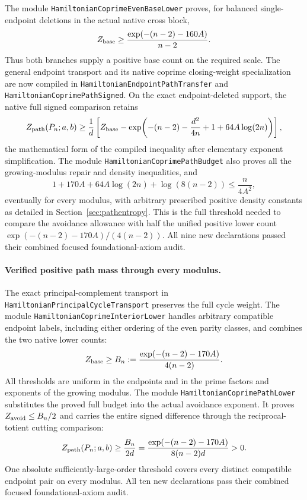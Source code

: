 The module \texttt{HamiltonianCoprimeEvenBaseLower} proves, for
balanced single-endpoint deletions in the actual native cross block,
\[
 Z_{\rm base}\geq
       \frac{\exp(-(n-2)-160A)}{n-2}.
\]
Thus both branches supply a positive base count on the required scale.
The general endpoint transport and its native coprime closing-weight
specialization are now compiled in \texttt{HamiltonianEndpointPathTransfer}
and \texttt{HamiltonianCoprimePathSigned}.
On the exact endpoint-deleted support, the native full signed
comparison retains
\[
 Z_{\rm path}(P_n;a,b)\geq\frac1d
 \left[Z_{\rm base}-
       \exp\!\left(-(n-2)-\frac{d^2}{4n}+1
                         +64A\log(2n)\right)\right],
\]
the mathematical form of the compiled inequality after elementary
exponent simplification.
The module \texttt{HamiltonianCoprimePathBudget} also proves all the
growing-modulus repair and density inequalities, and
\[
 1+170A+64A\log(2n)+\log(8(n-2))\leq\frac n{4A^2},
\]
eventually for every modulus, with arbitrary prescribed positive
density constants as detailed in Section~\ref{sec:pathentropy}.
This is the full threshold needed to compare the avoidance allowance
with half the unified positive lower count
\(\exp(-(n-2)-170A)/(4(n-2))\).
All nine new declarations passed their combined focused
foundational-axiom audit.
\paragraph{Verified positive path mass through every modulus.}
The exact principal-complement transport in
\texttt{HamiltonianPrincipalCycleTransport} preserves the full cycle
weight. The module \texttt{HamiltonianCoprimeInteriorLower} handles
arbitrary compatible endpoint labels, including either ordering of
the even parity classes, and combines the two native lower counts:
\[
 Z_{\rm base}\geq B_n:=
       \frac{\exp(-(n-2)-170A)}{4(n-2)}.
\]
All thresholds are uniform in the endpoints and in the prime factors
and exponents of the growing modulus.
The module \texttt{HamiltonianCoprimePathLower} substitutes the
proved full budget into the actual avoidance exponent. It proves
\(Z_{\rm avoid}\leq B_n/2\) and carries the entire signed difference
through the reciprocal-totient cutting comparison:
\[
 Z_{\rm path}(P_n;a,b)\geq
 \frac{B_n}{2d}=
 \frac{\exp(-(n-2)-170A)}{8(n-2)d}>0.
\]
One absolute sufficiently-large-order threshold covers every
distinct compatible endpoint pair on every modulus.
All ten new declarations pass their combined focused
foundational-axiom audit.

